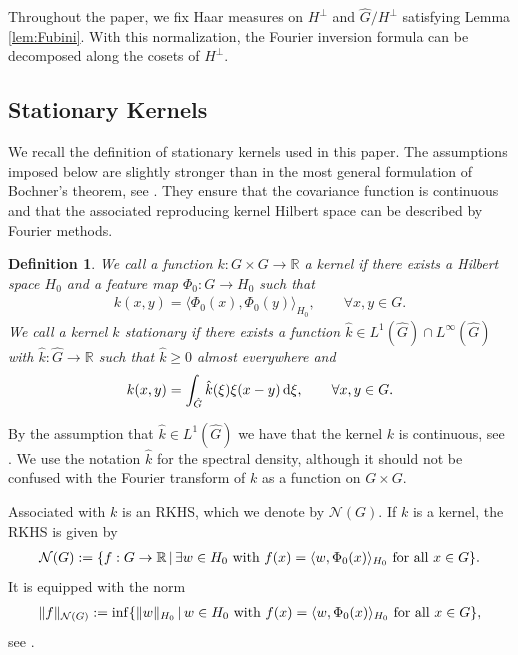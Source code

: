 \documentclass{article}
\renewcommand{\d}{\, \textup{d}}
\newtheorem{definition}[theorem]{Definition}
\newcommand{\R}{\mathbb{R}}
\begin{document}
Throughout the paper, we fix Haar measures on $H^\perp$ and $\hat G/H^\perp$ satisfying Lemma \ref{lem:Fubini}. With this normalization, the Fourier inversion formula can be decomposed along the cosets of $H^\perp$.


\subsection{Stationary Kernels}

We recall the definition of stationary kernels used in this paper. The assumptions imposed below are slightly stronger than in the most general formulation of Bochner's theorem, see \cite[Theorem 4.18]{Folland}. They ensure that the covariance function is continuous and that the associated reproducing kernel Hilbert space can be described by Fourier methods.

\begin{definition}
We call a function $k:G \times G \to \R$ a kernel if there exists a Hilbert space $H_0$ and a feature map $\Phi_0:G \to H_0$ such that 
\begin{align*}
    k(x,y)=\langle \Phi_0(x),\Phi_0(y)\rangle_{H_0}, \qquad  \forall x,y \in G.
\end{align*}
We call a kernel $k$ stationary if there exists a function $\hat{k} \in L^1(\hat{G}) \cap L^\infty(\hat{G})$ with $\hat{k}: \hat{G} \to \R $ such that $\hat{k} \geq 0$ almost everywhere and 
\begin{align*}
    k(x,y)= \int_{\hat{G}} \hat{k}(\xi) \xi(x  -y) \d \xi, \qquad \forall x,y \in G.
\end{align*}
\end{definition} 
By the assumption that $\hat{k} \in L^1(\hat{G})$ we have that the kernel $k$ is continuous, see \cite[Lemma 4.28]{SteinwartSVM}.  
We use the notation $\hat{k}$ for the spectral density, although it should not be confused with the Fourier transform of $k$ as a function on $G \times G$. 


Associated with $k$ is an RKHS, which we denote by $\mathcal{N}(G)$. If $k$ is a kernel, the RKHS is given by 
\begin{align*}
    \mathcal{N}(G):= \{ f : G \to \R \, \vert \, \exists w \in H_0 \, \, \textup{with} \, \, f(x)=\langle w, \Phi_0(x) \rangle_{H_0} \, \, \textup{for all} \, \, x \in G \}.
\end{align*}
It is equipped with the norm 
\begin{align*}
    \Vert f \Vert_{\mathcal{N}(G)}:= \inf \{ \Vert w \Vert_{H_0} \, \vert \, w \in H_0 \, \, \textup{with} \, \, f(x) = \langle w , \Phi_0(x) \rangle_{H_0} \, \, \textup{for all} \, \, x \in G  \},
\end{align*}
see \cite[Theorem 4.21]{SteinwartSVM}. 
\end{document}
